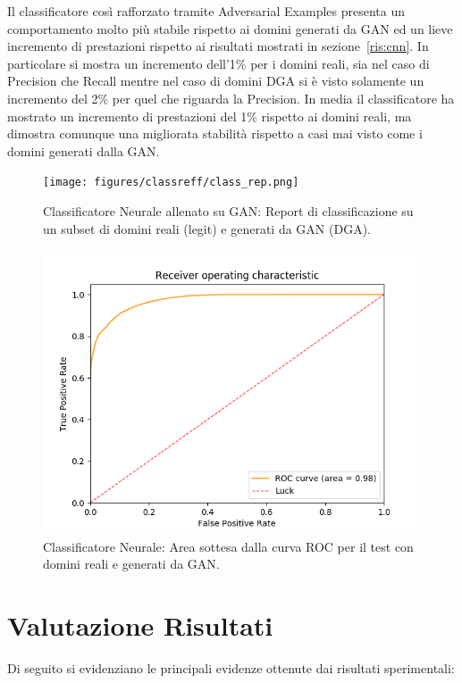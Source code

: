 Il classificatore così rafforzato tramite Adversarial Examples presenta un comportamento molto più stabile rispetto ai domini generati da GAN ed un  lieve incremento di prestazioni rispetto ai risultati mostrati in sezione~\ref{ris:cnn}. In particolare si mostra un incremento dell'1\% per i domini reali, sia nel caso di Precision che Recall mentre nel caso di domini DGA si è visto solamente un incremento del 2\% per quel che riguarda la Precision. In media il classificatore ha mostrato un incremento di prestazioni del 1\% rispetto ai domini reali, ma dimostra comunque una migliorata stabilità rispetto a casi mai visto come i domini generati dalla GAN.

\begin{figure}[!bp]
    \centering
    \texttt{[image: figures/classreff/class\_rep.png]}
    \caption{Classificatore Neurale allenato su GAN: Report di classificazione su un subset di domini reali (legit) e generati da GAN (DGA).\label{fig:repnngan}}
\end{figure}

\begin{figure}[!bp]
    \centering
    \includegraphics[width=\columnwidth]{figures/classreff/roc_plot.png}
    \caption{Classificatore Neurale: Area sottesa dalla curva ROC per il test con domini reali e generati da GAN.\label{fig:rocnngan}}
\end{figure}

\newpage
\section{Valutazione Risultati}
Di seguito si evidenziano le principali evidenze ottenute dai risultati sperimentali:


